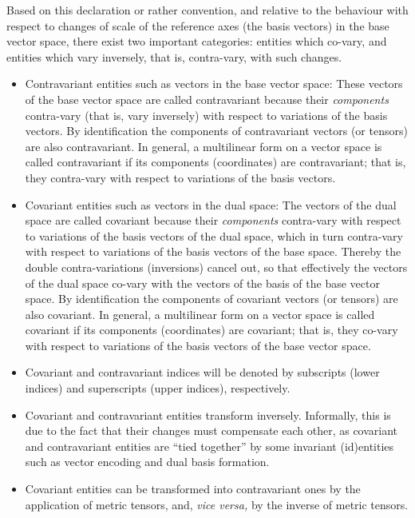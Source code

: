 Based on this declaration or rather convention,
and  relative to the behaviour with respect to changes of scale of the reference axes (the basis vectors) in the base vector space,
there exist two important categories: entities which co-vary, and entities which vary inversely, that is, contra-vary, with such changes.
\begin{itemize}

\item  Contravariant entities such as vectors in the base vector space:
These vectors of the base vector space are called contravariant because
their {\em components} contra-vary (that is, vary inversely) with respect to variations of the basis vectors.
By identification the components of contravariant vectors (or tensors) are also contravariant.
In general, a multilinear form on a vector space is called contravariant if its components
(coordinates) are contravariant; that is, they contra-vary with respect to variations of the basis vectors.

\item
Covariant entities such as vectors in the dual space:
The vectors of the dual space are called covariant because
their {\em components} contra-vary with respect to variations of the basis vectors of the dual space,
which in turn contra-vary with respect to variations of the basis vectors of the base space.
Thereby the double contra-variations (inversions) cancel out,
so that effectively the vectors of the dual space co-vary with the vectors of the basis of the base vector space.
By identification the components of covariant vectors (or tensors) are also covariant.
In general, a multilinear form on a vector space is called covariant if its components
(coordinates) are covariant; that is, they co-vary with respect to variations of the basis vectors of the base vector space.

\item
Covariant and contravariant indices will be denoted by subscripts (lower indices) and superscripts (upper indices), respectively.

\item
Covariant and contravariant entities transform inversely.
Informally, this is due to the fact that their changes must compensate each other,
as covariant and contravariant entities are ``tied together'' by some invariant
(id)entities such as vector encoding and dual basis formation.

\item
Covariant entities can be transformed into contravariant ones
by the application of metric tensors,
and, {\it vice versa,} by the inverse of  metric tensors.
\end{itemize}



